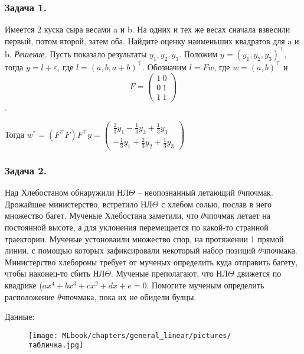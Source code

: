 \subsubsection*{Задача 1.} 
Имеется 2 куска сыра весами a и b. На одних и тех же весах сначала взвесили первый, потом второй, затем оба. Найдите оценку наименьших квадратов для a и b.
\noindent\textit{Решение.} Пусть показало результаты $y_1, y_2, y_3$. Положим $y = (y_1, y_2, y_3)^\top$, тогда $y = l + \varepsilon$, где $l = (a, b, a + b)^\top$. Обозначим $l = Fw$, где $w = (a, b)^\top$ и 
$$F = \begin{pmatrix}
    1 \ 0 \\
    0 \ 1 \\
    1 \ 1
\end{pmatrix}$$.

Тогда $w^* = (F^\top F) F^\top y = \begin{pmatrix}
    \frac{2}{3}y_1 - \frac{1}{3}y_2 + \frac{1}{3}y_3 \\
    -\frac{1}{3}y_1 + \frac{2}{3}y_2 + \frac{1}{3}y_3
\end{pmatrix}$

\subsubsection*{Задача 2.} Над Хлебостаном обнаружили НЛ$\Theta$ -- неопознанный летающий $\theta$чпочмак. Дрожайшее министерство, встретило НЛ$\Theta$ с хлебом солью, послав в него множество багет.
Мученые Хлебостана заметили, что $\theta$чпочмак летает на постоянной высоте, а для уклонения перемещается по какой-то странной траектории. Мученые устоноваили множество спор, на протяжении 1 прямой линии, с помощью которых зафиксировали некоторый набор позиций $\theta$чпочмака. Министерство хлебороны требует от мученых определить куда отправить багету, чтобы наконец-то сбить НЛ$\Theta$. Мученые преполагают, что НЛ$\Theta$ движется по квадрике ($ax^4 + bx^3 + cx^2 + dx + e = 0$. Помогите мученым определить расположение $\theta$чпочмака, пока их не обидели булцы.

Данные:
\begin{figure}[h]
    \centering
    \texttt{[image: MLbook/chapters/general\_linear/pictures/табличка.jpg]}
\end{figure}
 
